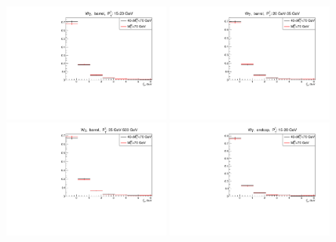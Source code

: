 \begin{figure}[htb]
  \begin{center}
  \includegraphics[width=0.48\textwidth]{../figs/figs_v11/MUON_WGamma/QuickChecks/cTemplatesVsWMt_Wg_phoPFChIsoCorr_BARREL_pt15to20.pdf} \includegraphics[width=0.48\textwidth]{../figs/figs_v11/MUON_WGamma/QuickChecks/cTemplatesVsWMt_Wg_phoPFChIsoCorr_BARREL_pt20to35.pdf} \\
  \includegraphics[width=0.48\textwidth]{../figs/figs_v11/MUON_WGamma/QuickChecks/cTemplatesVsWMt_Wg_phoPFChIsoCorr_BARREL_pt35to500.pdf}  \includegraphics[width=0.48\textwidth]{../figs/figs_v11/MUON_WGamma/QuickChecks/cTemplatesVsWMt_Wg_phoPFChIsoCorr_ENDCAP_pt15to20.pdf} \\

\end{center}
\end{figure}

